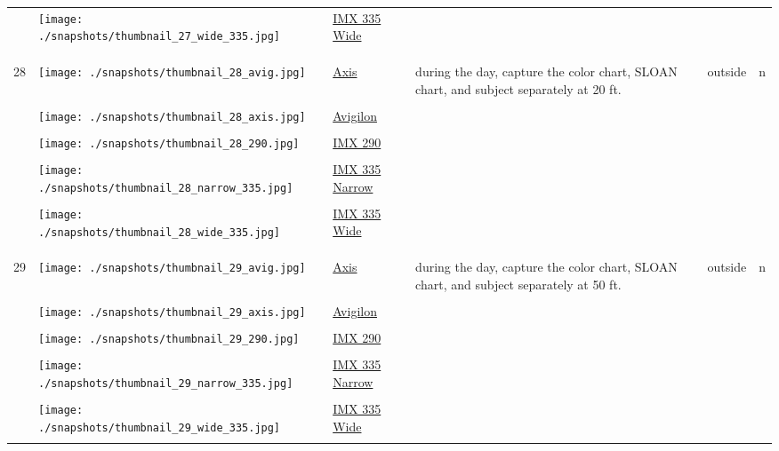 \documentclass{article}%
\begin{document}
\begin{longtabu}{m{2.5cm} m{4cm} m{2cm} m{4cm} m{2cm} m{2cm}}
&\texttt{[image: ./snapshots/thumbnail\_27\_wide\_335.jpg]}&\href{https://google.com}{IMX 335 Wide}&&&\\%
&&&&&\\%
&&&&&\\%
\hline%
&&&&&\\%
28&\texttt{[image: ./snapshots/thumbnail\_28\_avig.jpg]}&\href{https://google.com}{Axis}&during the day, capture the color chart, SLOAN chart, and subject separately at 20 ft.&outside&n\\%
&&&&&\\%
&\texttt{[image: ./snapshots/thumbnail\_28\_axis.jpg]}&\href{https://google.com}{Avigilon}&&&\\%
&&&&&\\%
&\texttt{[image: ./snapshots/thumbnail\_28\_290.jpg]}&\href{https://google.com}{IMX 290}&&&\\%
&&&&&\\%
&\texttt{[image: ./snapshots/thumbnail\_28\_narrow\_335.jpg]}&\href{https://google.com}{IMX 335 Narrow}&&&\\%
&&&&&\\%
&\texttt{[image: ./snapshots/thumbnail\_28\_wide\_335.jpg]}&\href{https://google.com}{IMX 335 Wide}&&&\\%
&&&&&\\%
&&&&&\\%
\hline%
&&&&&\\%
29&\texttt{[image: ./snapshots/thumbnail\_29\_avig.jpg]}&\href{https://google.com}{Axis}&during the day, capture the color chart, SLOAN chart, and subject separately at 50 ft.&outside&n\\%
&&&&&\\%
&\texttt{[image: ./snapshots/thumbnail\_29\_axis.jpg]}&\href{https://google.com}{Avigilon}&&&\\%
&&&&&\\%
&\texttt{[image: ./snapshots/thumbnail\_29\_290.jpg]}&\href{https://google.com}{IMX 290}&&&\\%
&&&&&\\%
&\texttt{[image: ./snapshots/thumbnail\_29\_narrow\_335.jpg]}&\href{https://google.com}{IMX 335 Narrow}&&&\\%
&&&&&\\%
&\texttt{[image: ./snapshots/thumbnail\_29\_wide\_335.jpg]}&\href{https://google.com}{IMX 335 Wide}&&&\\%
&&&&&\\%

\end{longtabu}
\end{document}
